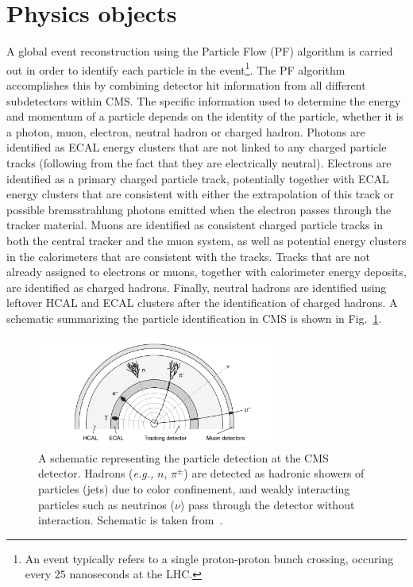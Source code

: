\section{Physics objects} \label{sec:objects}

\graphicspath{{3_DataAnalysisStrategy/Figures}}

A global event reconstruction using the Particle Flow (PF) algorithm \cite{cms:particle_flow} is carried out in order to
identify each particle in the 
event\footnote{An event typically refers to a single proton-proton bunch crossing, occuring
every $25$ nanoseconds at the LHC.}. 
The PF algorithm accomplishes this by combining detector hit information
from all different subdetectors within CMS. The specific information used to determine the energy
and momentum of a particle depends on the identity of the particle, whether it is a photon, muon, electron,
neutral hadron or charged hadron. Photons are identified as ECAL energy clusters that are not linked to 
any charged particle tracks (following from the fact that they are electrically neutral). 
Electrons are identified as a primary charged particle track, potentially 
together with ECAL energy clusters that are consistent with either the extrapolation of this track or possible
bremsstrahlung photons emitted when the electron passes through the tracker material. Muons are identified as 
consistent charged particle tracks in both the central tracker and the muon system, as well as potential energy
clusters in the calorimeters that are consistent with the tracks. Tracks that are not already assigned to electrons or muons,
together with calorimeter energy deposits, are identified as charged hadrons. Finally, neutral hadrons are identified using leftover 
HCAL and ECAL clusters after the identification of charged hadrons. A schematic summarizing the particle identification in CMS
is shown in Fig.~\ref{fig:particle_detection_cms}.

\begin{figure}[htbp]
    \centering
    \includegraphics[width=0.7\textwidth]{particle_detection_schematic.png}
    \caption{A schematic representing the particle detection at the CMS detector.
    Hadrons (\textit{e.g.,} $n$, $\pi^{\pm}$) are detected as hadronic showers of particles (jets)
    due to color confinement, and weakly interacting particles such as neutrinos ($\nu$) pass through the
    detector without interaction. Schematic is taken from~\cite{Thomson:2013zua}.}
    \label{fig:particle_detection_cms}
\end{figure}


